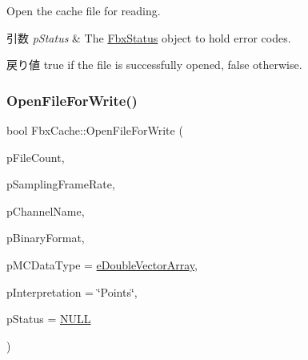 Open the cache file for reading. 
\begin{DoxyParams}{引数}
{\em p\+Status} & The \hyperlink{class_fbx_status}{Fbx\+Status} object to hold error codes. \\
\hline
\end{DoxyParams}
\begin{DoxyReturn}{戻り値}
{\ttfamily true} if the file is successfully opened, {\ttfamily false} otherwise. 
\end{DoxyReturn}
\mbox{\label{class_fbx_cache_a430c418e921a876f442c064b301418be}} 
\subsubsection{\texorpdfstring{Open\+File\+For\+Write()}{OpenFileForWrite()}\hspace{0.1cm}{\footnotesize\ttfamily [1/2]}}
{\footnotesize\ttfamily bool Fbx\+Cache\+::\+Open\+File\+For\+Write (\begin{DoxyParamCaption}\item[{\hyperlink{class_fbx_cache_afa5d133385fbd74b59e619c692a9cc36}{E\+M\+C\+File\+Count}}]{p\+File\+Count,  }\item[{double}]{p\+Sampling\+Frame\+Rate,  }\item[{const char $\ast$}]{p\+Channel\+Name,  }\item[{\hyperlink{class_fbx_cache_af3afea849dd371f0b5ecbe135d34b829}{E\+M\+C\+Binary\+Format}}]{p\+Binary\+Format,  }\item[{\hyperlink{class_fbx_cache_a80f82fa5f485ff6c46565ffb151998b3}{E\+M\+C\+Data\+Type}}]{p\+M\+C\+Data\+Type = {\ttfamily \hyperlink{class_fbx_cache_a80f82fa5f485ff6c46565ffb151998b3a650d3bda5d6886776bee42118f711cb3}{e\+Double\+Vector\+Array}},  }\item[{const char $\ast$}]{p\+Interpretation = {\ttfamily \char`\"{}Points\char`\"{}},  }\item[{\hyperlink{class_fbx_status}{Fbx\+Status} $\ast$}]{p\+Status = {\ttfamily \hyperlink{fbxarch_8h_a070d2ce7b6bb7e5c05602aa8c308d0c4}{N\+U\+LL}} }\end{DoxyParamCaption})}

